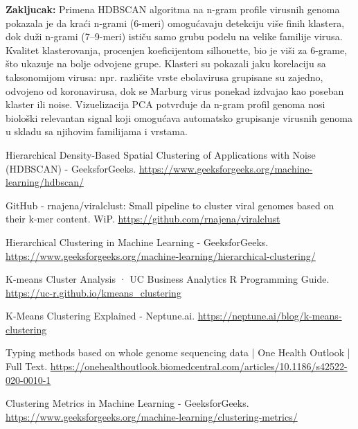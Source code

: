\documentclass[a4paper,12pt]{article}
\begin{document}
\noindent
\begin{minipage}{\textwidth}
\textbf{Zakljucak:} Primena HDBSCAN algoritma na n-gram profile virusnih genoma pokazala je da kraći n-grami (6-meri) omogućavaju detekciju više finih klastera, dok duži n-grami (7–9-meri) ističu samo grubu podelu na velike familije virusa. Kvalitet klasterovanja, procenjen koeficijentom silhouette, bio je viši za 6-grame, što ukazuje na bolje odvojene grupe. Klasteri su pokazali jaku korelaciju sa taksonomijom virusa: npr. različite vrste ebolavirusa grupisane su zajedno, odvojeno od koronavirusa, dok se Marburg virus ponekad izdvajao kao poseban klaster ili noise. Vizuelizacija PCA potvrđuje da n-gram profil genoma nosi biološki relevantan signal koji omogućava automatsko grupisanje virusnih genoma u skladu sa njihovim familijama i vrstama.
\end{minipage}

\newpage
\begin{thebibliography}{99}

Hierarchical Density-Based Spatial Clustering of Applications with Noise (HDBSCAN) - GeeksforGeeks.  
\url{https://www.geeksforgeeks.org/machine-learning/hdbscan/}

GitHub - rnajena/viralclust: Small pipeline to cluster viral genomes based on their k-mer content. WiP.  
\url{https://github.com/rnajena/viralclust}

Hierarchical Clustering in Machine Learning - GeeksforGeeks.  
\url{https://www.geeksforgeeks.org/machine-learning/hierarchical-clustering/}

K-means Cluster Analysis · UC Business Analytics R Programming Guide.  
\url{https://uc-r.github.io/kmeans_clustering}

K-Means Clustering Explained - Neptune.ai.  
\url{https://neptune.ai/blog/k-means-clustering}

Typing methods based on whole genome sequencing data | One Health Outlook | Full Text.  
\url{https://onehealthoutlook.biomedcentral.com/articles/10.1186/s42522-020-0010-1}

Clustering Metrics in Machine Learning - GeeksforGeeks.  
\url{https://www.geeksforgeeks.org/machine-learning/clustering-metrics/}

\end{thebibliography}
\end{document}
